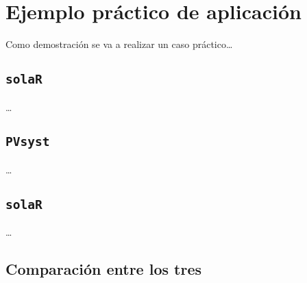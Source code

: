 \chapter{Ejemplo práctico de aplicación}
\label{chap:ejemplo-practico-aplicacion}
Como demostración se va a realizar un caso práctico\ldots{}

\section{\texttt{solaR}}
\label{sec:org3a43d49}

\ldots{}


\section{\texttt{PVsyst}}
\label{sec:orgaff593d}

\ldots{}


\section{\texttt{solaR}}
\label{sec:orgf42178d}

\ldots{}

\section{Comparación entre los tres}
\label{sec:org2ce52e4}
